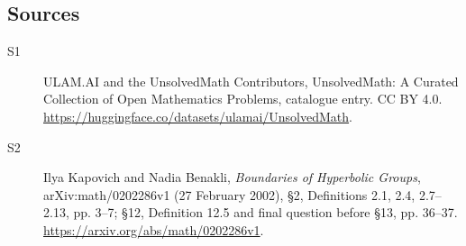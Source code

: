 \documentclass[11pt]{article}
\begin{document}
\subsection{Sources}
\begin{description}
\item[\hypertarget{source:statement:1}{S1}] ULAM.AI and the UnsolvedMath Contributors, UnsolvedMath: A Curated Collection of Open Mathematics Problems, catalogue entry. CC BY 4.0. \url{https://huggingface.co/datasets/ulamai/UnsolvedMath}.
\item[\hypertarget{source:statement:2}{S2}] Ilya Kapovich and Nadia Benakli, \emph{Boundaries of Hyperbolic Groups}, arXiv:math/0202286v1 (27 February 2002), \S2, Definitions 2.1, 2.4, 2.7--2.13, pp. 3--7; \S12, Definition 12.5 and final question before \S13, pp. 36--37. \url{https://arxiv.org/abs/math/0202286v1}.
\end{description}
\label{end:statement}
\end{document}
